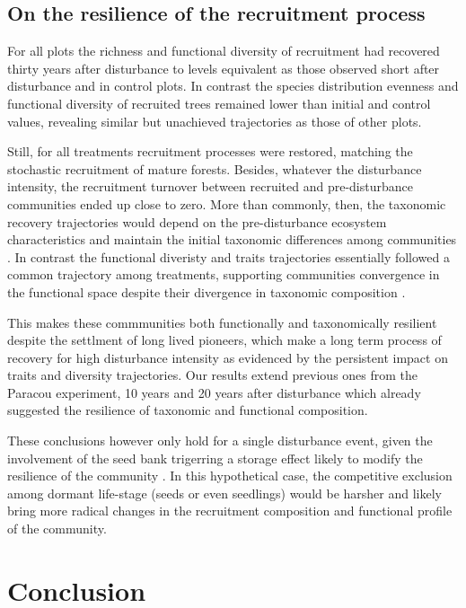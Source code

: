 \documentclass[fleqn,10pt]{ArtEcoFoG} %
\begin{document}
\subsection{On the resilience of the recruitment
process}\label{on-the-resilience-of-the-recruitment-process}

For all plots the richness and functional diversity of recruitment had
recovered thirty years after disturbance to levels equivalent as those
observed short after disturbance and in control plots. In contrast the
species distribution evenness and functional diversity of recruited
trees remained lower than initial and control values, revealing similar
but unachieved trajectories as those of other plots.

Still, for all treatments recruitment processes were restored, matching
the stochastic recruitment of mature forests. Besides, whatever the
disturbance intensity, the recruitment turnover between recruited and
pre-disturbance communities ended up close to zero. More than commonly,
then, the taxonomic recovery trajectories would depend on the
pre-disturbance ecosystem characteristics and maintain the initial
taxonomic differences among communities
\citep{Anderson2007, Herault2018}. In contrast the functional diveristy
and traits trajectories essentially followed a common trajectory among
treatments, supporting communities convergence in the functional space
despite their divergence in taxonomic composition \citep{Fukami2005}.

This makes these commmunities both functionally and taxonomically
resilient despite the settlment of long lived pioneers, which make a
long term process of recovery for high disturbance intensity as
evidenced by the persistent impact on traits and diversity trajectories.
Our results extend previous ones from the Paracou experiment, 10 years
\citep{Molino2001} and 20 years \citep{Baraloto2012a} after disturbance
which already suggested the resilience of taxonomic and functional
composition.

These conclusions however only hold for a single disturbance event,
given the involvement of the seed bank trigerring a storage effect
likely to modify the resilience of the community \citep{Norden2009}. In
this hypothetical case, the competitive exclusion among dormant
life-stage (seeds or even seedlings) would be harsher and likely bring
more radical changes in the recruitment composition and functional
profile of the community.

\section{Conclusion}\label{conclusion}
\end{document}
